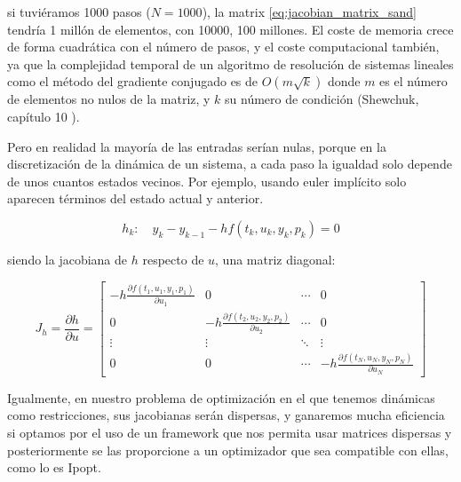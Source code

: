si tuviéramos 1000 pasos ($N=1000$), la matrix \eqref{eq:jacobian_matrix_sand}
tendría 1 millón de elementos, con 10000, 100 millones. El coste de memoria
crece de forma cuadrática con el número de pasos, y el coste computacional
también, ya que la complejidad temporal de un algoritmo de resolución de
sistemas lineales como el método del gradiente conjugado es de $O(m\sqrt{k})$
donde $m$ es el número de elementos no nulos de la matriz, y $k$ su número de
condición (Shewchuk, capítulo 10 \cite{shewchuk1994introduction}).

Pero en realidad la mayoría de las entradas serían nulas, porque en la
discretización de la dinámica de un sistema, a cada paso la igualdad solo
depende de unos cuantos estados vecinos. Por ejemplo, usando euler implícito
solo aparecen términos del estado actual y anterior.

\begin{equation} \label{eq:implicit_euler_equality}
	h_k: \quad y_k - y_{k-1} - h f(t_k, u_k, y_k, p_k) = 0
\end{equation}

siendo la jacobiana de $h$ respecto de $u$, una matriz diagonal:

\begin{equation} \label{eq:diagonal_jacobian}
	J_h = \frac{\partial h}{\partial u} =
	\begin{bmatrix}
		-h \frac{\partial f(t_1, u_1, y_1, p_1)}{\partial u_1} & 0                                                      & \cdots & 0                                                      \\
		0                                                      & -h \frac{\partial f(t_2, u_2, y_2, p_2)}{\partial u_2} & \cdots & 0                                                      \\
		\vdots                                                 & \vdots                                                 & \ddots & \vdots                                                 \\
		0                                                      & 0                                                      & \cdots & -h \frac{\partial f(t_N, u_N, y_N, p_N)}{\partial u_N}
	\end{bmatrix}
\end{equation}

Igualmente, en nuestro problema de optimización en el que tenemos dinámicas
como restricciones, sus jacobianas serán dispersas, y ganaremos mucha eficiencia
si optamos por el uso de un framework que nos permita usar matrices dispersas y
posteriormente se las proporcione a un optimizador que sea compatible con ellas,
como lo es Ipopt.

